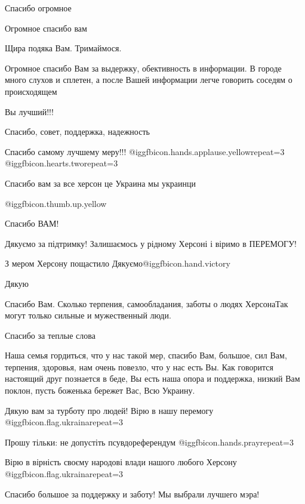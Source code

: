 \begin{itemize}
Спасибо огромное

Огромное спасибо вам

Щира подяка Вам. Тримаймося.


Огромное спасибо Вам за выдержку, обективность в информации. В городе много
слухов и сплетен, а после Вашей информации легче говорить соседям о
происходящем

Вы лучший!!!

Спасибо, совет, поддержка, надежность

Спасибо самому лучшему меру!!!  @igg{fbicon.hands.applause.yellow}{repeat=3}  @igg{fbicon.hearts.two}{repeat=3} 

Спасибо вам за все херсон це Украина мы украинци

 @igg{fbicon.thumb.up.yellow} 

Спасибо ВАМ!

Дякуємо за підтримку! Залишаємось у рідному Херсоні і віримо в ПЕРЕМОГУ!

З мером Херсону пощастило
Дякуємо@igg{fbicon.hand.victory}

Дякую

Спасибо Вам. Сколько терпения, самообладания, заботы о людях ХерсонаТак могут
только сильные и мужественный люди.

Спасибо за теплые слова


Наша семья гордиться, что у нас такой мер, спасибо Вам, большое, сил
Вам, терпения, здоровья, нам очень повезло, что у нас есть Вы. Как говорится
настоящий друг познается в беде, Вы есть наша опора и поддержка, низкий Вам
поклон, пусть боженька бережет Вас, Всю Украину.


Дякую вам за турботу про людей! Вірю в нашу перемогу @igg{fbicon.flag.ukraina}{repeat=3}

Прошу тільки: не допустіть псувдореферендум  @igg{fbicon.hands.pray}{repeat=3} 

Вірю в вірність своєму народові влади нашого любого Херсону @igg{fbicon.flag.ukraina}{repeat=3}

Спасибо большое за поддержку и заботу! Мы выбрали лучшего мэра!


\end{itemize}
